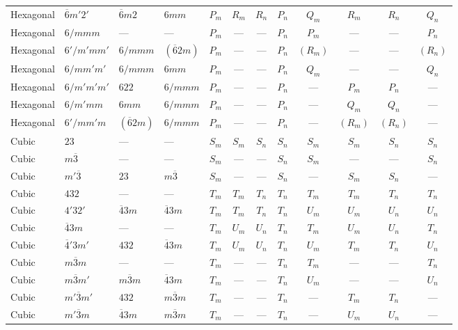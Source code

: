 \documentclass[a4paper,11pt]{article}
\newcommand{\ob}[1]{\overline{#1}}
\begin{document}
\begin{landscape}
\begin{longtable}{l l l l *{4}{c} *{4}{c}}
Hexagonal & $\ob{6}m'2'$ & $\ob{6}m2$ & $6mm$ & $P_m$ & $R_m$ & $R_n$ & $P_n$ & $Q_m$ & $R_m$ & $R_n$ & $Q_n$ \\
Hexagonal & $6/mmm$ & --- & --- & $P_m$ & --- & --- & $P_n$ & $P_m$ & --- & --- & $P_n$ \\
Hexagonal & $6'/m'mm'$ & $6/mmm$ & $(\ob{6}2m)$ & $P_m$ & --- & --- & $P_n$ & $(R_m)$ & --- & --- & $(R_n)$ \\
Hexagonal & $6/mm'm'$ & $6/mmm$ & $6mm$ & $P_m$ & --- & --- & $P_n$ & $Q_m$ & --- & --- & $Q_n$ \\
Hexagonal & $6/m'm'm'$ & $622$ & $6/mmm$ & $P_m$ & --- & --- & $P_n$ & --- & $P_m$ & $P_n$ & --- \\
Hexagonal & $6/m'mm$ & $6mm$ & $6/mmm$ & $P_m$ & --- & --- & $P_n$ & --- & $Q_m$ & $Q_n$ & --- \\
Hexagonal & $6'/mm'm$ & $(\ob{6}2m)$ & $6/mmm$ & $P_m$ & --- & --- & $P_n$ & --- & $(R_m)$ & $(R_n)$ & --- \\
\addlinespace
Cubic & $23$ & --- & --- & $S_m$ & $S_m$ & $S_n$ & $S_n$ & $S_m$ & $S_m$ & $S_n$ & $S_n$ \\
Cubic & $m\ob{3}$ & --- & --- & $S_m$ & --- & --- & $S_n$ & $S_m$ & --- & --- & $S_n$ \\
Cubic & $m'\ob{3}$ & $23$ & $m\ob{3}$ & $S_m$ & --- & --- & $S_n$ & --- & $S_m$ & $S_n$ & --- \\
Cubic & $432$ & --- & --- & $T_m$ & $T_m$ & $T_n$ & $T_n$ & $T_m$ & $T_m$ & $T_n$ & $T_n$ \\
Cubic & $4'32'$ & $\ob{4}3m$ & $\ob{4}3m$ & $T_m$ & $T_m$ & $T_n$ & $T_n$ & $U_m$ & $U_m$ & $U_n$ & $U_n$ \\
Cubic & $\ob{4}3m$ & --- & --- & $T_m$ & $U_m$ & $U_n$ & $T_n$ & $T_m$ & $U_m$ & $U_n$ & $T_n$ \\
Cubic & $\ob{4}'3m'$ & $432$ & $\ob{4}3m$ & $T_m$ & $U_m$ & $U_n$ & $T_n$ & $U_m$ & $T_m$ & $T_n$ & $U_n$ \\
Cubic & $m\ob{3}m$ & --- & --- & $T_m$ & --- & --- & $T_n$ & $T_m$ & --- & --- & $T_n$ \\
Cubic & $m\ob{3}m'$ & $m\ob{3}m$ & $\ob{4}3m$ & $T_m$ & --- & --- & $T_n$ & $U_m$ & --- & --- & $U_n$ \\
Cubic & $m'\ob{3}m'$ & $432$ & $m\ob{3}m$ & $T_m$ & --- & --- & $T_n$ & --- & $T_m$ & $T_n$ & --- \\
Cubic & $m'\ob{3}m$ & $\ob{4}3m$ & $m\ob{3}m$ & $T_m$ & --- & --- & $T_n$ & --- & $U_m$ & $U_n$ & --- \\
\end{longtable}
\end{landscape}
\end{document}
